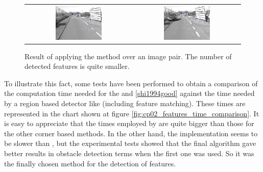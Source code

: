 \begin{figure}[h!]
\begin{tabular}{cc}
\includegraphics[width=0.45\textwidth]{featuresSIFT1}\label{fig:cp02_features_sift_1} &
\includegraphics[width=0.45\textwidth]{featuresSIFT2}\label{fig:cp02_features_sift_2}
\end{tabular}
\caption{Result of applying the \cite{lowe1999object} method over an image pair. The number of detected features is quite smaller.}\label{fig:cp02_sift_features}
\end{figure}

To illustrate this fact, some tests have been performed to obtain a comparison of the computation time needed for the  \cite{harris1988combined} and \ref{shi1994good} against the time needed by a region based detector like \cite{bay2008speeded} (including feature matching). These times are represented in the chart shown at figure \ref{fig:cp02_features_time_comparison}. It is easy to appreciate that the times employed by \cite{bay2008speeded} are quite bigger than those for the other corner based methods. In the other hand, the \cite{shi1994good} implementation seems to be slower than \cite{harris1988combined}, but the experimental tests showed that the final algorithm gave better results in obstacle detection terms when the first one was used. So it was the finally chosen method for the detection of features.

